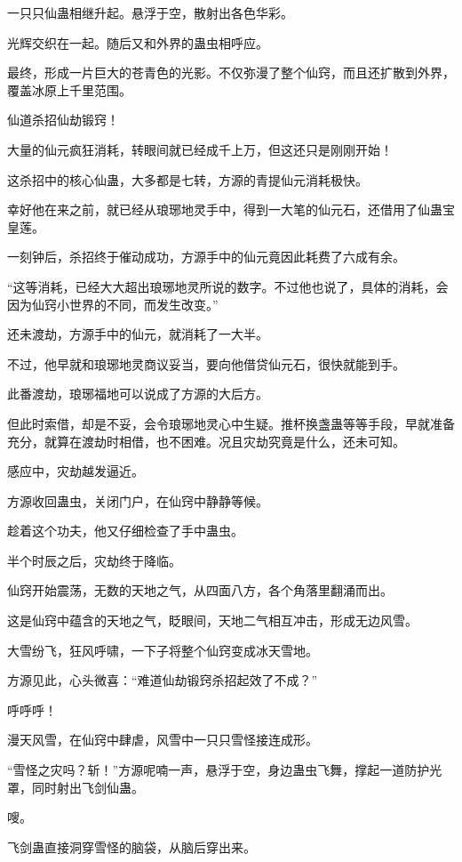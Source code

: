 \begin{this_body}
一只只仙蛊相继升起。悬浮于空，散射出各色华彩。

光辉交织在一起。随后又和外界的蛊虫相呼应。

最终，形成一片巨大的苍青色的光影。不仅弥漫了整个仙窍，而且还扩散到外界，覆盖冰原上千里范围。

仙道杀招仙劫锻窍！

大量的仙元疯狂消耗，转眼间就已经成千上万，但这还只是刚刚开始！

这杀招中的核心仙蛊，大多都是七转，方源的青提仙元消耗极快。

幸好他在来之前，就已经从琅琊地灵手中，得到一大笔的仙元石，还借用了仙蛊宝皇莲。

一刻钟后，杀招终于催动成功，方源手中的仙元竟因此耗费了六成有余。

“这等消耗，已经大大超出琅琊地灵所说的数字。不过他也说了，具体的消耗，会因为仙窍小世界的不同，而发生改变。”

还未渡劫，方源手中的仙元，就消耗了一大半。

不过，他早就和琅琊地灵商议妥当，要向他借贷仙元石，很快就能到手。

此番渡劫，琅琊福地可以说成了方源的大后方。

但此时索借，却是不妥，会令琅琊地灵心中生疑。推杯换盏蛊等等手段，早就准备充分，就算在渡劫时相借，也不困难。况且灾劫究竟是什么，还未可知。

感应中，灾劫越发逼近。

方源收回蛊虫，关闭门户，在仙窍中静静等候。

趁着这个功夫，他又仔细检查了手中蛊虫。

半个时辰之后，灾劫终于降临。

仙窍开始震荡，无数的天地之气，从四面八方，各个角落里翻涌而出。

这是仙窍中蕴含的天地之气，眨眼间，天地二气相互冲击，形成无边风雪。

大雪纷飞，狂风呼啸，一下子将整个仙窍变成冰天雪地。

方源见此，心头微喜：“难道仙劫锻窍杀招起效了不成？”

呼呼呼！

漫天风雪，在仙窍中肆虐，风雪中一只只雪怪接连成形。

“雪怪之灾吗？斩！”方源呢喃一声，悬浮于空，身边蛊虫飞舞，撑起一道防护光罩，同时射出飞剑仙蛊。

嗖。

飞剑蛊直接洞穿雪怪的脑袋，从脑后穿出来。


\end{this_body}
